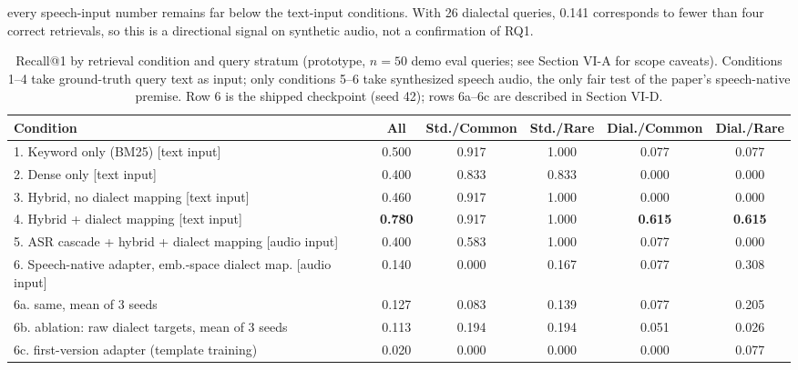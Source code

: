 \documentclass[conference]{IEEEtran}
\begin{document}
every speech-input number remains far below the text-input conditions. With 26 dialectal queries, 0.141 corresponds to fewer than four correct retrievals, so this is a directional signal on synthetic audio, not a confirmation of RQ1.

\begin{table}[t]
\caption{Recall@1 by retrieval condition and query stratum (prototype, $n{=}50$ demo eval queries; see Section VI-A for scope caveats). Conditions 1--4 take ground-truth query text as input; only conditions 5--6 take synthesized speech audio, the only fair test of the paper's speech-native premise. Row 6 is the shipped checkpoint (seed 42); rows 6a--6c are described in Section VI-D.}
\centering
\footnotesize
\begin{tabular}{@{}lccccc@{}}
\toprule
\textbf{Condition} & \textbf{All} & \textbf{Std./Common} & \textbf{Std./Rare} & \textbf{Dial./Common} & \textbf{Dial./Rare} \\
\midrule
1. Keyword only (BM25) [text input]                    & 0.500 & 0.917 & 1.000 & 0.077 & 0.077 \\
2. Dense only [text input]                              & 0.400 & 0.833 & 0.833 & 0.000 & 0.000 \\
3. Hybrid, no dialect mapping [text input]              & 0.460 & 0.917 & 1.000 & 0.000 & 0.000 \\
4. Hybrid + dialect mapping [text input]                & \textbf{0.780} & 0.917 & 1.000 & \textbf{0.615} & \textbf{0.615} \\
5. ASR cascade + hybrid + dialect mapping [audio input]  & 0.400 & 0.583 & 1.000 & 0.077 & 0.000 \\
6. Speech-native adapter, emb.-space dialect map. [audio input] & 0.140 & 0.000 & 0.167 & 0.077 & 0.308 \\
\quad 6a. same, mean of 3 seeds                          & 0.127 & 0.083 & 0.139 & 0.077 & 0.205 \\
\quad 6b. ablation: raw dialect targets, mean of 3 seeds & 0.113 & 0.194 & 0.194 & 0.051 & 0.026 \\
\quad 6c. first-version adapter (template training)      & 0.020 & 0.000 & 0.000 & 0.000 & 0.077 \\
\bottomrule
\end{tabular}
\label{tab:retrieval}
\end{table}
\end{document}
